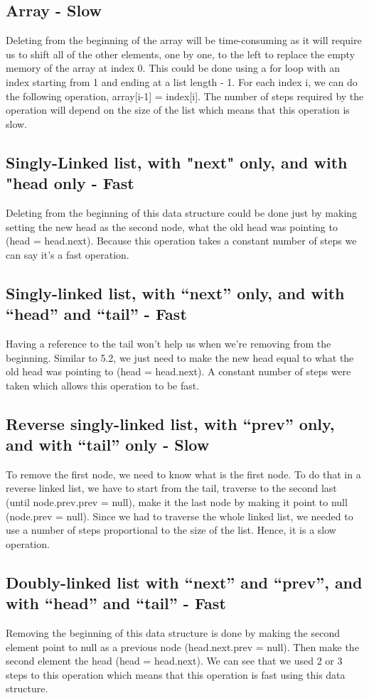 \documentclass{article}
\begin{document}
\subsection{Array - Slow}
Deleting from the beginning of the array will be time-consuming as it will require us to shift all of the other elements, one by one, to the left to replace the empty memory of the array at index 0. This could be done using a for loop with an index starting from 1 and ending at a list length - 1. For each index i, we can do the following operation, array[i-1] = index[i]. The number of steps required by the operation will depend on the size of the list which means that this operation is slow.

\subsection{Singly-Linked list, with "next" only, and with "head only - Fast}
Deleting from the beginning of this data structure could be done just by making setting the new head as the second node, what the old head was pointing to (head = head.next). Because this operation takes a constant number of steps we can say it's a fast operation.

\subsection{Singly-linked list, with “next” only, and with “head” and “tail” - Fast}
Having a reference to the tail won't help us when we're removing from the beginning. Similar to 5.2, we just need to make the new head equal to what the old head was pointing to (head = head.next). A constant number of steps were taken which allows this operation to be fast.

\subsection{Reverse singly-linked list, with “prev” only, and with “tail” only - Slow}
To remove the first node, we need to know what is the first node. To do that in a reverse linked list, we have to start from the tail, traverse to the second last (until node.prev.prev = null), make it the last node by making it point to null (node.prev = null). Since we had to traverse the whole linked list, we needed to use a number of steps proportional to the size of the list. Hence, it is a slow operation.

\subsection{Doubly-linked list with “next” and “prev”, and with “head” and “tail” - Fast}
Removing the beginning of this data structure is done by making the second element point to null as a previous node (head.next.prev = null). Then make the second element the head (head = head.next). We can see that we used 2 or 3 steps to this operation which means that this operation is fast using this data structure.
\end{document}

